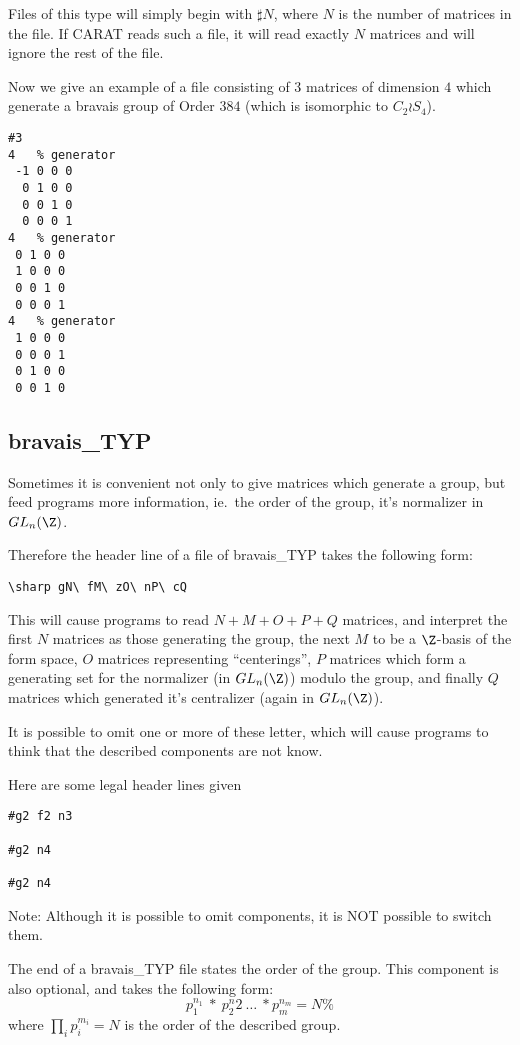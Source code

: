 Files of this type will simply begin with $\sharp N$, where $N$ is the
number of matrices in the file. If CARAT reads such a file, it will
read exactly $N$ matrices and will ignore the rest of the file.

Now we give an example of a file consisting of $3$ matrices of dimension $4$
which generate a bravais group of Order $384$ (which is isomorphic to
$C_2 \wr S_4$).
\begin{verbatim}
#3
4	% generator
 -1 0 0 0
  0 1 0 0
  0 0 1 0
  0 0 0 1
4	% generator
 0 1 0 0
 1 0 0 0
 0 0 1 0
 0 0 0 1
4	% generator
 1 0 0 0
 0 0 0 1
 0 1 0 0
 0 0 1 0
\end{verbatim}


\subsection{\rm bravais\_TYP}

Sometimes it is convenient not only to give matrices which generate a
group, but feed programs more information, ie.\ the order of the group,
it's normalizer in $GL_n(\Z)$.

Therefore the header line of a file of {\rm bravais\_TYP} takes the
following form:
\begin{verbatim}
\sharp gN\ fM\ zO\ nP\ cQ
\end{verbatim}
This will cause programs to read $N+M+O+P+Q$ matrices, and interpret
the first $N$ matrices as those generating the group, the next $M$
to be a $\Z$-basis of the form space, $O$ matrices representing ``centerings'',
$P$ matrices which form a generating set for the normalizer (in $GL_n(\Z)$)
modulo the group, and finally $Q$ matrices which generated it's centralizer
(again in $GL_n(\Z)$).

It is possible to omit one or more of these letter, which will cause
programs to think that the described components are not know.

Here are some legal header lines given
\begin{verbatim}
#g2 f2 n3

#g2 n4

#g2 n4
\end{verbatim}
Note: Although it is possible to omit components, it is NOT possible to switch
them.

The end of a {\rm bravais\_TYP} file states the order of the group. This
component is also optional, and takes the following form:
\begin{displaymath}
p_1^{n_1}\ \ast\ p_2^n2\ \dots\ \ast p_m^{n_m} = N\%
\end{displaymath}
where $\prod_i p_i^{m_i} = N$ is the order of the described group.

